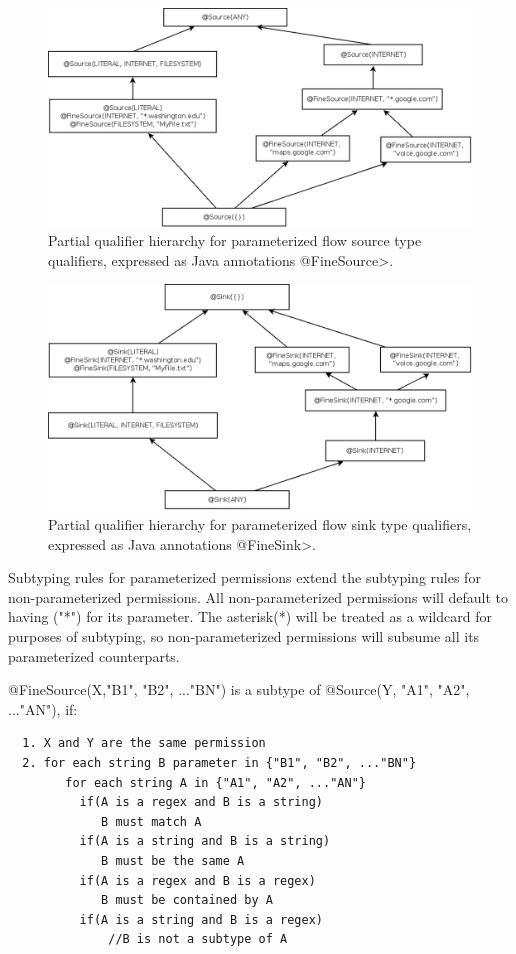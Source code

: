 \begin{figure}
\centerline{\includegraphics[width=1.0\textwidth]{figures/flowsources_parameterized}}
\caption{Partial qualifier hierarchy for parameterized flow source type
  qualifiers, expressed as Java annotations \<@FineSource>.}
\label{fig:flow-hierarchy-parameterized-source}
\end{figure}

\begin{figure}
\centerline{\includegraphics[width=1.0\textwidth]{figures/flowsinks_parameterized}}
\caption{Partial qualifier hierarchy for parameterized flow sink type
  qualifiers, expressed as Java annotations \<@FineSink>.}
\label{fig:flow-hierarchy-parameterized-sink}
\end{figure}

Subtyping rules for parameterized permissions extend the subtyping rules for
non-parameterized permissions. All non-parameterized permissions will default
to having ("*") for its parameter. The asterisk(*) will be treated as a wildcard
for purposes of subtyping, so non-parameterized permissions will subsume all
its parameterized counterparts. 

\noindent
@FineSource(X,{"B1", "B2", ..."BN"}) is a subtype of @Source(Y, {"A1", "A2", ..."AN"}), 
if:
\begin{Verbatim}
  1. X and Y are the same permission
  2. for each string B parameter in {"B1", "B2", ..."BN"}
        for each string A in {"A1", "A2", ..."AN"}
          if(A is a regex and B is a string)
             B must match A
          if(A is a string and B is a string)
             B must be the same A
          if(A is a regex and B is a regex)
             B must be contained by A
          if(A is a string and B is a regex)
              //B is not a subtype of A
\end{Verbatim}

